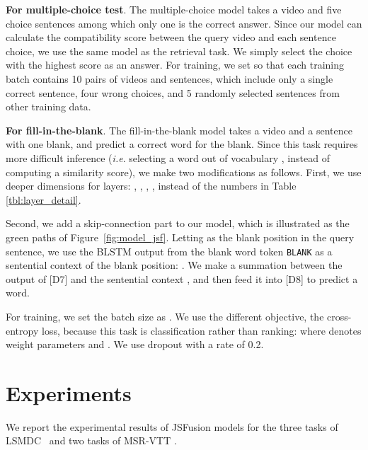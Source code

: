 \documentclass[runningheads]{llncs}
\makeatletter
\DeclareRobustCommand\onedot{\futurelet\@let@token\@onedot}
\def\onedot{.\@\xspace}
\def\ie{\textit{i.e}\onedot} \def\Ie{\textit{I.e}\onedot}
\makeatother
\begin{document}
\textbf{For multiple-choice test}.
The multiple-choice model takes a video and five choice sentences among which only one is the correct answer.
Since our model can calculate the compatibility score between the query video and each sentence choice, we use the same model as the retrieval task.
We simply select the choice with the highest score as an answer.
For training, we set  so that each training batch contains 10 pairs of videos and sentences, which include only a single correct sentence, four wrong choices, and 5 randomly selected sentences from other training data. 


\textbf{For fill-in-the-blank}.
The fill-in-the-blank model takes a video and a sentence with one blank, and predict a correct word for the blank. 
Since this task requires more difficult inference (\ie selecting a word out of vocabulary , instead of computing a similarity score),
we make two modifications as follows. 
First, we use deeper dimensions for layers: , ,  
, , instead of the numbers in Table \ref{tbl:layer_detail}.

Second, we add a skip-connection part to our model, which is illustrated as the green paths of Figure~\ref{fig:model_jsf}. 
Letting   as the blank position in the query sentence, we use the BLSTM output from the blank word token \texttt{BLANK} as a sentential context of the blank position: . 
We make a summation between the output of [D7]  and the sentential context , 
and then feed it into [D8] to predict a word.

For training, we set the batch size as . 
We use the different objective, the cross-entropy loss, because this task is classification rather than ranking:
where  denotes weight parameters and .
We use dropout with a rate of 0.2. 


\section{Experiments}
\label{sec:experiments}

We report the experimental results of JSFusion models for the three tasks of LSMDC~\cite{rohrbach-arxiv-2016} and two tasks of MSR-VTT \cite{xu-CVPR-2016}. 
\end{document}
